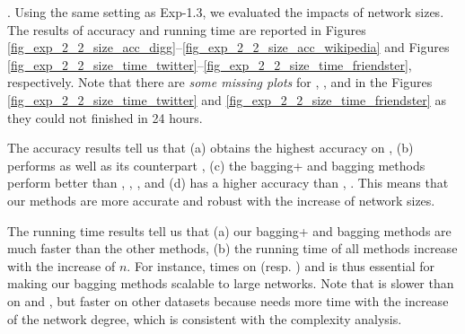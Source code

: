. Using the same setting as Exp-1.3, we
evaluated the impacts of network sizes. The results of accuracy and running time
are reported in Figures \ref{fig_exp_2_2_size_acc_digg}--\ref{fig_exp_2_2_size_acc_wikipedia}
and Figures \ref{fig_exp_2_2_size_time_twitter}--\ref{fig_exp_2_2_size_time_friendster}, respectively.
Note that there are {\em some missing plots} for \NMF, \Aa, \marked{\RA} and
\BIGCLAM in the Figures \ref{fig_exp_2_2_size_time_twitter} and
\ref{fig_exp_2_2_size_time_friendster} as they could not finished in 24 hours.



The accuracy results tell us that (a) \Biased obtains the highest accuracy on
, (b) \Biasedp performs as well as its counterpart \Biased,
(c) the bagging+ and bagging methods perform better than \NMF, \Aa, ,
and (d) \NMF has a higher accuracy than \Aa, . This means that
our methods are more accurate and robust with the increase of network sizes.

The running time results tell us that (a) our bagging+ and bagging methods are much faster than the other methods,
(b) the running time of all methods increase with the increase of $n$. For
instance, 
times on \Twitter (resp. \Friendster) and is thus essential for
making our bagging methods scalable to large networks. Note
that \NMF is slower than \BIGCLAM on \Digg and \YouTube,
but faster on other datasets because \BIGCLAM needs more time with
the increase of the network degree, which is consistent with the complexity analysis.


